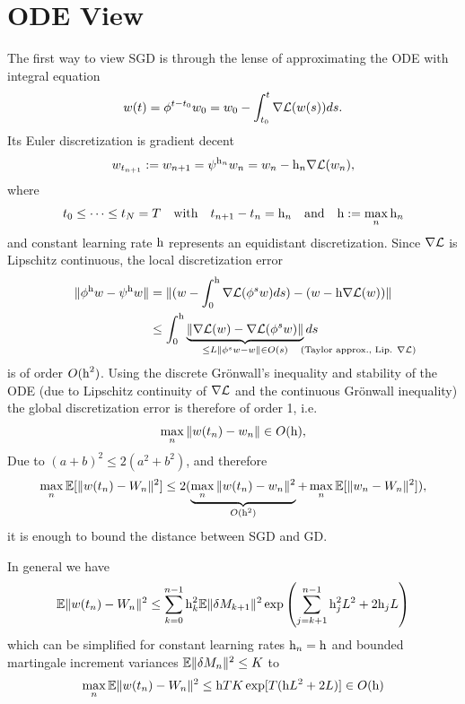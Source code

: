 \section{ODE View}

The first way to view SGD is through the lense of approximating the ODE with
integral equation
\begin{align*}
	w(t) = \phi^{t-t_0}w_0 =  w_0 -\int_{t_0}^{t}\nabla\mathcal{L}(w(s))ds.
\end{align*}
Its Euler discretization is gradient decent 
\begin{align*}
	w_{t_{n+1}}:=w_{n+1}
	= \psi^{\text{h}_n} w_n = w_n - \text{h}_n \nabla\mathcal{L}(w_n),
\end{align*}
where
\begin{align*}
	t_0 \le \dots \le t_N= T \quad \text{with} \quad t_{n+1}-t_n=\text{h}_n
	\quad \text{and}\quad \text{h}:=\max_n \text{h}_n
\end{align*}
and constant learning rate \(\text{h}\) represents an equidistant discretization.
Since \(\nabla\mathcal{L}\) is Lipschitz continuous, the local discretization error
\begin{align*}
	\|\phi^\lr \weights  - \psi^\lr \weights \|
	&= \|(\weights - \int_0^\lr\nabla\Loss(\phi^s \weights)ds) - (\weights-\lr\nabla\Loss(w))\|\\
	&\le  \int_0^\lr \underbrace{\|\nabla\Loss(w) - \nabla\Loss(\phi^s\weights)\|}_{
		\le \ubound \|\phi^s \weights - \weights\| \in O(s) \mathrlap{\quad\text{(Taylor approx., Lip. \(\nabla\Loss\))}}
	}ds 
\end{align*}
is of order \(O(\text{h}^2)\). 
Using the discrete Gr\"onwall's inequality and stability of the ODE (due to Lipschitz continuity of
\(\nabla\mathcal{L}\) and the continuous Gr\"onwall inequality) the global discretization
error is therefore of order 1, i.e.
\begin{align*}
	\max_{n} \|w(t_n) - w_n\| \in O(\text{h}),
\end{align*}
Due to \((a+b)^2\le2(a^2+b^2)\), and therefore 
\begin{align*}
	\max_n\mathbb{E}[\|w(t_n)-W_n\|^2]
	\le 2(\underbrace{\max_n \|w(t_n)-w_n\|^2}_{O(\text{h}^2)}
	+\max_{n}\mathbb{E}[\|w_n - W_n\|^2]),
\end{align*}
it is enough to bound the distance between SGD and GD.
\begin{theorem}\label{thm: distance SGD vs GD}
	In general we have
	\begin{align*}
		\mathbb{E}\|w(t_n)-W_n\|^2
		\le \sum_{k=0}^{n-1}\text{h}_k^2\mathbb{E}\|\delta M_{k+1}\|^2\exp\left(
			\sum_{j=k+1}^{n-1}\text{h}_j^2L^2 + 2\text{h}_jL
		\right)
	\end{align*}
	which can be simplified for constant learning rates \(\text{h}_n=\text{h}\) and bounded
	martingale increment variances \(\mathbb{E}\|\delta M_n\|^2 \le K\) to
	\begin{align*}
		\max_{n}\mathbb{E}\|w(t_n)	-W_n\|^2
		\le \text{h} TK\exp[T(\text{h}L^2 + 2L)] \in O(\text{h})
	\end{align*}
\end{theorem}
